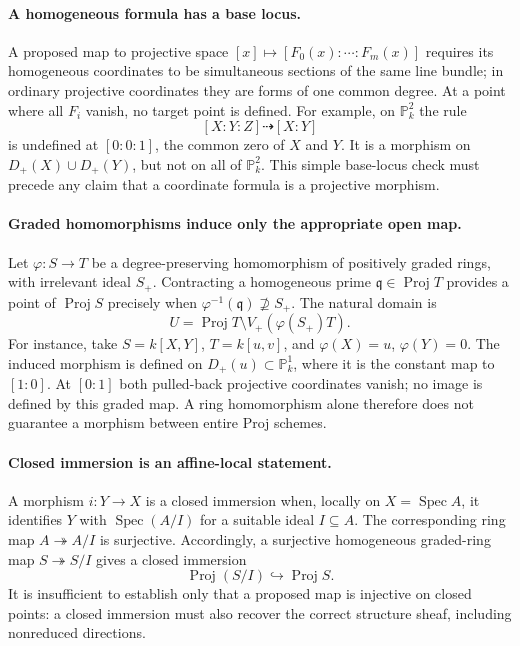 \paragraph{A homogeneous formula has a base locus.}
A proposed map to projective space
\([x]\mapsto[F_0(x):\cdots:F_m(x)]\) requires its homogeneous
coordinates to be simultaneous sections of the same line bundle;
in ordinary projective coordinates they are forms of one common
degree.  At a point where all \(F_i\) vanish, no target point is
defined.  For example, on \(\mathbb P_k^2\) the rule
\[
 [X:Y:Z]\dashrightarrow[X:Y]
\]
is undefined at \([0:0:1]\), the common zero of \(X\) and \(Y\).
It is a morphism on \(D_+(X)\cup D_+(Y)\), but not on all of
\(\mathbb P_k^2\).  This simple base-locus check must precede
any claim that a coordinate formula is a projective morphism.

\paragraph{Graded homomorphisms induce only the appropriate open map.}
Let \(\varphi:S\to T\) be a degree-preserving homomorphism
of positively graded rings, with irrelevant ideal \(S_+\).
Contracting a homogeneous prime \(\mathfrak q\in\operatorname{Proj}T\)
provides a point of \(\operatorname{Proj}S\) precisely when
\(\varphi^{-1}(\mathfrak q)\not\supseteq S_+\).
The natural domain is
\[
 U=\operatorname{Proj}T\setminus V_+(\varphi(S_+)T).
\]
For instance, take \(S=k[X,Y]\), \(T=k[u,v]\), and
\(\varphi(X)=u\), \(\varphi(Y)=0\).
The induced morphism is defined on \(D_+(u)\subset\mathbb P_k^1\),
where it is the constant map to \([1:0]\).  At \([0:1]\)
both pulled-back projective coordinates vanish; no image is defined
by this graded map.  A ring homomorphism alone therefore does not
guarantee a morphism between entire Proj schemes.

\paragraph{Closed immersion is an affine-local statement.}
A morphism \(i:Y\to X\) is a closed immersion when, locally on
\(X=\operatorname{Spec}A\), it identifies \(Y\) with
\(\operatorname{Spec}(A/I)\) for a suitable ideal \(I\subseteq A\).
The corresponding ring map \(A\twoheadrightarrow A/I\) is
surjective.  Accordingly, a surjective homogeneous graded-ring map
\(S\twoheadrightarrow S/I\) gives a closed immersion
\[
 \operatorname{Proj}(S/I)\hookrightarrow\operatorname{Proj}S.
\]
It is insufficient to establish only that a proposed map is
injective on closed points: a closed immersion must also recover
the correct structure sheaf, including nonreduced directions.

